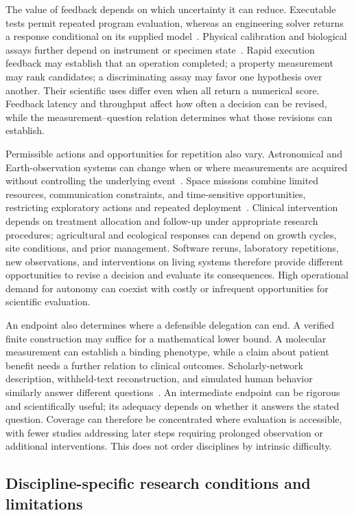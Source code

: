 The value of feedback depends on which uncertainty it can reduce. Executable tests permit repeated program evaluation, whereas an engineering solver returns a response conditional on its supplied model~\cite{asd0512,asd0047}. Physical calibration and biological assays further depend on instrument or specimen state~\cite{asd0090,king2004}. Rapid execution feedback may establish that an operation completed; a property measurement may rank candidates; a discriminating assay may favor one hypothesis over another. Their scientific uses differ even when all return a numerical score. Feedback latency and throughput affect how often a decision can be revised, while the measurement--question relation determines what those revisions can establish.

Permissible actions and opportunities for repetition also vary. Astronomical and Earth-observation systems can change when or where measurements are acquired without controlling the underlying event~\cite{asd0136,asd0722}. Space missions combine limited resources, communication constraints, and time-sensitive opportunities, restricting exploratory actions and repeated deployment~\cite{asd0645}. Clinical intervention depends on treatment allocation and follow-up under appropriate research procedures; agricultural and ecological responses can depend on growth cycles, site conditions, and prior management. Software reruns, laboratory repetitions, new observations, and interventions on living systems therefore provide different opportunities to revise a decision and evaluate its consequences. High operational demand for autonomy can coexist with costly or infrequent opportunities for scientific evaluation.

An endpoint also determines where a defensible delegation can end. A verified finite construction may suffice for a mathematical lower bound. A molecular measurement can establish a binding phenotype, while a claim about patient benefit needs a further relation to clinical outcomes. Scholarly-network description, withheld-text reconstruction, and simulated human behavior similarly answer different questions~\cite{asd0624,asd0652,asd0786}. An intermediate endpoint can be rigorous and scientifically useful; its adequacy depends on whether it answers the stated question. Coverage can therefore be concentrated where evaluation is accessible, with fewer studies addressing later steps requiring prolonged observation or additional interventions. This does not order disciplines by intrinsic difficulty.

\subsection{Discipline-specific research conditions and limitations}

